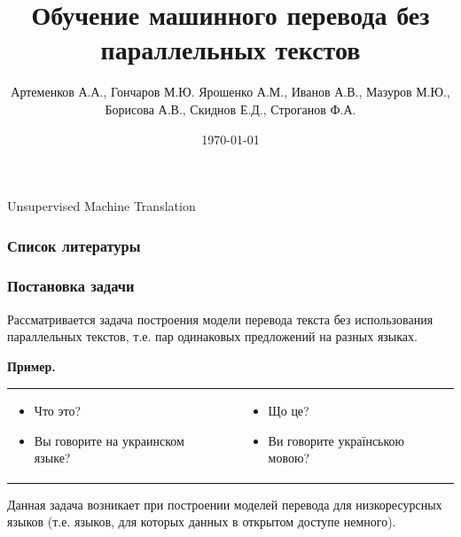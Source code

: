 \documentclass[10pt,pdf,hyperref={unicode}]{beamer}
\title{Обучение машинного перевода без параллельных текстов}
\subtitle{}
\author{Артеменков А.А., Гончаров М.Ю. Ярошенко А.М., Иванов А.В., Мазуров М.Ю., Борисова А.В., Скиднов Е.Д., Строганов Ф.А.}
\date{\today}
\begin{document}
\begin{frame}
	\begin{center}
		\begin{LARGE}
			Unsupervised Machine Translation
		\end{LARGE}
	\end{center}
\end{frame}


\begin{frame}
	\frametitle{Список литературы}
	\nocite{lample2017unsupervised} 
	\nocite{graves2005framewise}
	\nocite{kimimproving}
	\nocite{papineni2002bleu}
	
	
\end{frame}

\begin{frame}
	\frametitle{Постановка задачи}
	
	
	Рассматривается задача построения модели перевода текста без использования параллельных текстов, т.е. пар одинаковых предложений на разных языках.
	
	\textbf{Пример.}
	
	
	\begin{table}[ht]
		\centering
		\begin{tabular}{p{4cm}c| p{4cm}}
			\begin{itemize}
				\item Что это?
				
				\item Вы говорите на украинском языке? 
			\end{itemize}
			& \hfill & 
			\begin{itemize}
				
				\item Що це?
				
				\item Ви говорите українською мовою?
			\end{itemize}
		\end{tabular}
	\end{table}
	
	
	Данная задача возникает при построении моделей перевода для низкоресурсных языков (т.е. языков, для которых данных в открытом доступе немного).
	
	
\end{frame}
\end{document}
